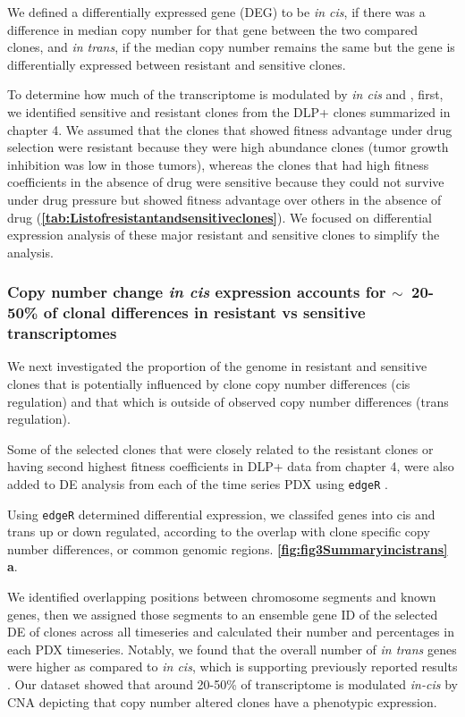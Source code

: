 We defined a differentially expressed gene (DEG) to be \textit{in cis}, if there was a difference in median copy number for that gene between the two compared clones, and \textit{in trans}, if the median copy number remains the same but the gene is differentially expressed between resistant and sensitive clones.

To determine how much of the transcriptome is modulated by \textit{in cis} and , first, we identified sensitive and resistant clones from the DLP+ clones summarized in chapter 4. We assumed that the clones that showed fitness advantage under drug selection were resistant because they were high abundance clones (tumor growth inhibition was low in those tumors), whereas the clones that had high fitness coefficients in the absence of drug were sensitive because they could not survive under drug pressure but showed fitness advantage over others in the absence of drug (\textbf{\autoref{tab:Listofresistantandsensitiveclones}}). We focused on differential expression analysis of these major resistant and sensitive clones to simplify the analysis.

\subsubsection{Copy number change \textit{in cis} expression accounts for {$\sim${~}}20-50\% of clonal differences in resistant vs sensitive transcriptomes}

We next investigated the proportion of the genome in resistant and sensitive clones that is potentially influenced by clone copy number differences (cis regulation) and that which is outside of observed copy number differences (trans regulation).

Some of the selected clones that were closely related to the resistant clones or having second highest fitness coefficients in DLP+ data from chapter 4, were also added to DE analysis from each of the time series PDX using \texttt{edgeR} \cite{robinson2010edger}. 

Using \texttt{edgeR} determined differential expression, we classifed genes into cis and trans up or down regulated, according to the overlap with clone specific copy number differences, or common genomic regions. \textbf{\autoref{fig:fig3Summaryincistrans} a}.

We identified overlapping positions between chromosome segments and known genes, then we assigned those segments to an ensemble gene ID \cite{rainer2019ensembldb} of the  selected \ac{DE} of clones across all timeseries and calculated their number and percentages in each PDX timeseries. Notably, we found that the overall number of \textit{in trans} genes were higher as compared to \textit{in cis}, which is supporting previously reported results \cite{shao2019copy}. Our dataset showed that around 20-50\% of transcriptome is modulated \textit{in-cis} by \ac{CNA} depicting that copy number altered clones have a phenotypic expression.

